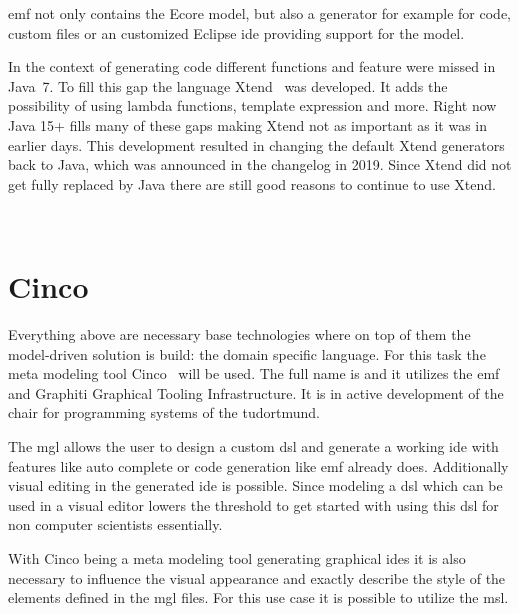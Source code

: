 \gls{emf} not only contains the Ecore model, but also a generator for example for code, custom files or an customized Eclipse \gls{ide} providing support for the model.

In the context of generating code different functions and feature were missed in Java~7. To fill this gap the language Xtend~\cite{xtendhp} was developed. It adds the possibility of using lambda functions,  template expression and more. Right now Java 15+ fills many of these gaps making Xtend not as important as it was in earlier days. This development resulted in changing the default Xtend generators back to Java, which was announced in the changelog in 2019. Since Xtend did not get fully replaced by Java there are still good reasons to continue to use Xtend.

~\cite{xtendToJava}


\section{Cinco}
Everything above are necessary base technologies where on top of them the model-driven solution  is build: the domain specific language. For this task the meta modeling tool Cinco~\cite{CincoHomepage} will be used. The full name is  and it utilizes the \gls{emf} and Graphiti Graphical Tooling Infrastructure. It is in active development of the chair for programming systems of the \gls{tudortmund}.

The \gls{mgl} allows the user to design a custom \gls{dsl} and generate a working \gls{ide} with features like auto complete or code generation like \gls{emf} already does. Additionally visual editing in the generated \gls{ide} is possible. Since modeling a \gls{dsl} which can be used in a visual editor lowers the threshold to get started with using this \gls{dsl} for non computer scientists essentially. 

With Cinco being a meta modeling tool generating graphical \glspl{ide} it is also necessary to influence the visual appearance and exactly describe the style of the elements defined in the \gls{mgl} files. For this use case it is possible to utilize the \gls{msl}.

